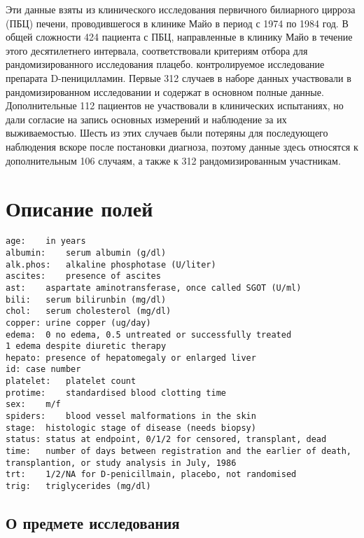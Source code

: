 \documentclass[
  11pt,
]{article}
\begin{document}
Эти данные взяты из клинического исследования первичного билиарного
цирроза (ПБЦ) печени, проводившегося в клинике Майо в период с 1974 по
1984 год. В общей сложности 424 пациента с ПБЦ, направленные в клинику
Майо в течение этого десятилетнего интервала, соответствовали критериям
отбора для рандомизированного исследования плацебо. контролируемое
исследование препарата D-пеницилламин. Первые 312 случаев в наборе
данных участвовали в рандомизированном исследовании и содержат в
основном полные данные. Дополнительные 112 пациентов не участвовали в
клинических испытаниях, но дали согласие на запись основных измерений и
наблюдение за их выживаемостью. Шесть из этих случаев были потеряны для
последующего наблюдения вскоре после постановки диагноза, поэтому данные
здесь относятся к дополнительным 106 случаям, а также к 312
рандомизированным участникам.

\hypertarget{ux43eux43fux438ux441ux430ux43dux438ux435-ux43fux43eux43bux435ux439}{%
\section{Описание
полей}\label{ux43eux43fux438ux441ux430ux43dux438ux435-ux43fux43eux43bux435ux439}}

\begin{verbatim}
age:    in years
albumin:    serum albumin (g/dl)
alk.phos:   alkaline phosphotase (U/liter)
ascites:    presence of ascites
ast:    aspartate aminotransferase, once called SGOT (U/ml)
bili:   serum bilirunbin (mg/dl)
chol:   serum cholesterol (mg/dl)
copper: urine copper (ug/day)
edema:  0 no edema, 0.5 untreated or successfully treated
1 edema despite diuretic therapy
hepato: presence of hepatomegaly or enlarged liver
id: case number
platelet:   platelet count
protime:    standardised blood clotting time
sex:    m/f
spiders:    blood vessel malformations in the skin
stage:  histologic stage of disease (needs biopsy)
status: status at endpoint, 0/1/2 for censored, transplant, dead
time:   number of days between registration and the earlier of death,
transplantion, or study analysis in July, 1986
trt:    1/2/NA for D-penicillmain, placebo, not randomised
trig:   triglycerides (mg/dl)
\end{verbatim}

\hypertarget{ux43e-ux43fux440ux435ux434ux43cux435ux442ux435-ux438ux441ux441ux43bux435ux434ux43eux432ux430ux43dux438ux44f}{%
\subsection{О предмете
исследования}\label{ux43e-ux43fux440ux435ux434ux43cux435ux442ux435-ux438ux441ux441ux43bux435ux434ux43eux432ux430ux43dux438ux44f}}
\end{document}
